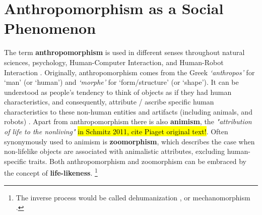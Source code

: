 \documentclass{frontiersSCNS} %
\begin{document}
	

%
%
%
%
%
%



\section{Anthropomorphism as a Social Phenomenon}
\label{sec:origins-anthropomorphism}

The term \textbf{anthropomorphism} is used in different senses throughout
natural sciences, psychology, Human-Computer Interaction, and Human-Robot
Interaction \cite{duffy_anthropomorphism_2003}. Originally, anthropomorphism
comes from the Greek \textit{`anthropos'} for `man' (or `human') and
\textit{`morphe'} for `form/structure' (or `shape'). It can be understood as
people's tendency to think of objects as if they had human characteristics, and
consequently, attribute / ascribe specific human characteristics to these
non-human entities and artifacts (including animals, and robots)
\cite{duffy_anthropomorphism_2003,schmitz_concepts_2011}. Apart from
anthropomorphism there is also \textbf{animism}, the \textit{"attribution of
life to the nonliving"} \hl{in Schmitz 2011, cite Piaget original text!}. Often
synonymously used to animism is \textbf{zoomorphism}, which describes the case
when non-lifelike objects are associated with animalistic attributes, excluding
human-specific traits. Both anthropomorphism and zoomorphism can be embraced by
the concept of \textbf{life-likeness}. \footnote{The inverse process would be
called dehumanization \cite{haslam_dehumanization:_2006}, or mechanomorphism
\cite{caporael_anthropomorphism_1986}.}
		
\end{document}

